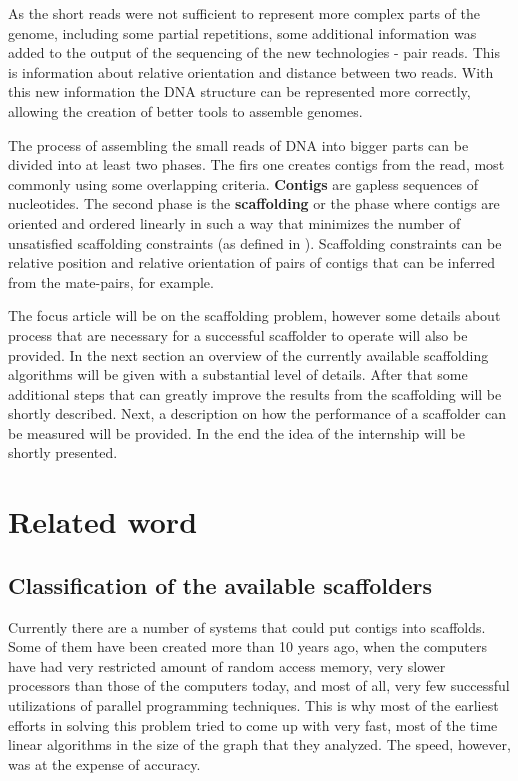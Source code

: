 \documentclass[11pt]{article}
\begin{document}
As the short reads were not sufficient to represent more complex parts of the
genome, including some partial repetitions, some additional information was
added to the output of the sequencing of the new technologies - pair reads. This
is information about relative orientation and distance between two reads. With
this new information the DNA structure can be represented more correctly,
allowing the creation of better tools to assemble genomes.

The process of assembling the small reads of DNA into bigger parts can be
divided into at least two phases. The firs one creates contigs from the read,
most commonly using some overlapping criteria. \textbf{Contigs} are gapless
sequences of nucleotides. The second phase is the \textbf{scaffolding} or the
phase where contigs are oriented and ordered linearly in such a way that
minimizes the number of unsatisfied scaffolding constraints (as defined in
\cite{grass}). Scaffolding constraints can be relative position and relative
orientation of pairs of contigs that can be inferred from the mate-pairs, for
example.

The focus article will be on the scaffolding problem, however some details about
process that are necessary for a successful scaffolder to operate will also be
provided. In the next section an overview of the currently available scaffolding
algorithms will be given with a substantial level of details. After that some
additional steps that can greatly improve the results from the scaffolding will
be shortly described. Next, a description on how the performance of a scaffolder
can be measured will be provided. In the end the idea of the internship will be
shortly presented. 


\section{Related word} %
\label{sec:Related word}

\subsection{Classification of the available scaffolders} %
\label{sub:Classification of the available scaffolders}
Currently there are a number of systems that could put contigs into scaffolds.
Some of them have been created more than 10 years ago, when the computers have
had very restricted amount of random access memory, very slower processors than
those of the computers today, and most of all, very few successful utilizations
of parallel programming techniques. This is why most of the earliest efforts in
solving this problem tried to come up with very fast, most of the time linear
algorithms in the size of the graph that they analyzed. The speed, however, was
at the expense of accuracy.
\end{document}

